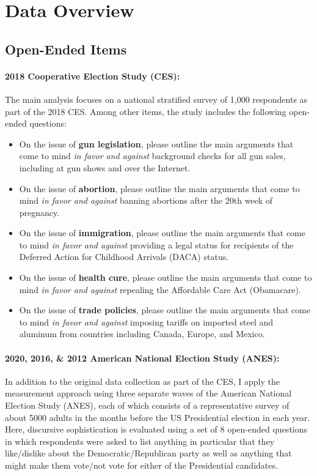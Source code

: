 \section{Data Overview}\label{app:variables}

\subsection{Open-Ended Items}

\paragraph{2018 Cooperative Election Study (CES):}
The main analysis focuses on a national stratified survey of 1,000 respondents as part of the 2018 CES. Among other items, the study includes the following open-ended questions:
\begin{itemize}
	\item On the issue of \textbf{gun legislation}, please outline the main arguments that come to mind \textit{in favor and against} background checks for all gun sales, including at gun shows and over the Internet.
	\item On the issue of \textbf{abortion}, please outline the main arguments that come to mind \textit{in favor and against} banning abortions after the 20th week of pregnancy.
	\item On the issue of \textbf{immigration}, please outline the main arguments that come to mind \textit{in favor and against} providing a legal status for recipients of the Deferred Action for Childhood Arrivals (DACA) status.
	\item On the issue of \textbf{health cure}, please outline the main arguments that come to mind \textit{in favor and against} repealing the Affordable Care Act (Obamacare).
	\item On the issue of \textbf{trade policies}, please outline the main arguments that come to mind \textit{in favor and against} imposing tariffs on imported steel and aluminum from countries including Canada, Europe, and Mexico.
\end{itemize}

\paragraph{2020, 2016, \& 2012 American National Election Study (ANES):}
In addition to the original data collection as part of the CES, I apply the measurement approach using three separate waves of the American National Election Study (ANES), each of which consists of a representative survey of about 5000 adults in the months before the US Presidential election in each year. Here, discursive sophistication is evaluated using a set of 8 open-ended questions in which respondents were asked to list anything in particular that they like/dislike about the Democratic/Republican party as well as anything that might make them vote/not vote for either of the Presidential candidates.

